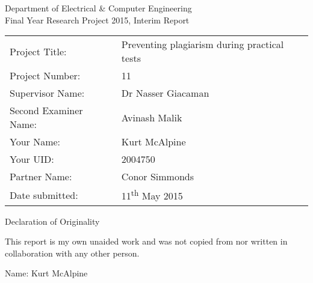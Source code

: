\begin{titlepage}


\vspace*{15em}


\centering

{\LARGE
Department of Electrical \& Computer Engineering \\
Final Year Research Project 2015, Interim Report}

\hspace{2em}

\begin{table*}[h]
\centering
\begin{tabular}{ll}
Project Title: & Preventing plagiarism during practical tests \\
Project Number: & 11 \\
Supervisor Name: & Dr Nasser Giacaman \\
Second Examiner Name: & Avinash Malik \\
Your Name: & Kurt McAlpine \\
Your UID: & 2004750 \\
Partner Name: & Conor Simmonds \\
Date submitted: & 11\textsuperscript{th} May 2015 \\

\end{tabular}
\end{table*}
\begin{table}


\end{table}
\pagebreak

\vspace*{25em}

{\Large Declaration of Originality}

\hspace{5em}

This report is my own unaided work and was not copied from 
nor written in collaboration with any other person.

Name: Kurt McAlpine


\end{titlepage}


